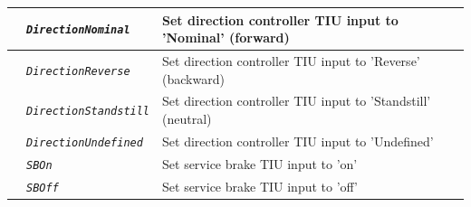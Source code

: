 \begin{itemize}
\begin{longtable}{|l|l|l|}
			\hline

			&	\begin{minipage}[t]{0.30\linewidth} \emph{\texttt{DirectionNominal}} \end{minipage}
			&	\begin{minipage}[t]{0.38\linewidth} Set direction controller TIU input to ’Nominal’ (forward) \end{minipage} \\

			\hline

			&	\begin{minipage}[t]{0.30\linewidth} \emph{\texttt{DirectionReverse}} \end{minipage}
			&	\begin{minipage}[t]{0.38\linewidth} Set direction controller TIU input to ’Reverse’ (backward) \end{minipage} \\

			\hline

			&	\begin{minipage}[t]{0.30\linewidth} \emph{\texttt{DirectionStandstill}} \end{minipage}
			&	\begin{minipage}[t]{0.38\linewidth} Set direction controller TIU input to ’Standstill’ (neutral) \end{minipage} \\

			\hline

			&	\begin{minipage}[t]{0.30\linewidth} \emph{\texttt{DirectionUndefined}} \end{minipage}
			&	\begin{minipage}[t]{0.38\linewidth} Set direction controller TIU input to ’Undefined’ \end{minipage} \\

			\hline

			&	\begin{minipage}[t]{0.30\linewidth} \emph{\texttt{SBOn}} \end{minipage}
			&	\begin{minipage}[t]{0.38\linewidth} Set service brake TIU input to ’on’ \end{minipage} \\

			\hline

			&	\begin{minipage}[t]{0.30\linewidth} \emph{\texttt{SBOff}} \end{minipage}
			&	\begin{minipage}[t]{0.38\linewidth} Set service brake TIU input to ’off’ \end{minipage} \\


\end{longtable}
\end{itemize}
